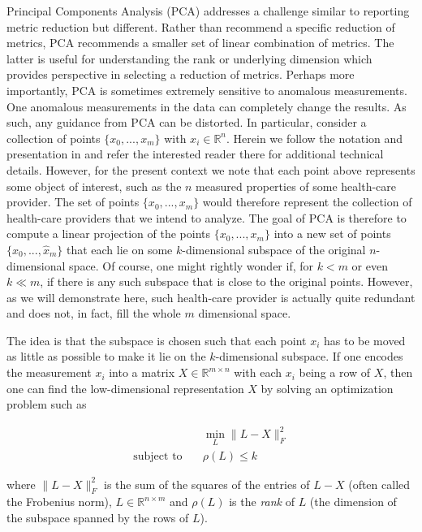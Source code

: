 \documentclass[conference]{IEEEtran}
\begin{document}
Principal Components Analysis (PCA) addresses a challenge similar to reporting metric reduction but different.  Rather than recommend a specific  reduction of metrics, PCA recommends a smaller set of linear combination of metrics.  The latter is useful for understanding the rank or underlying dimension which provides perspective in selecting a reduction of metrics. Perhaps more importantly,  PCA is sometimes extremely sensitive to anomalous measurements.  One anomalous measurements in the data can completely change the results.  As such, any guidance from PCA can be distorted.
In particular, consider a collection of
points $\{x_0,...,x_m\}$ with $x_i \in \mathbb{R}^n$.  Herein we follow the notation and presentation in \cite{paffenroth2018robust} and refer the interested reader there for additional technical details.  However, for the present context
we note that each point above represents some object  of interest, such as the $n$ measured properties of some health-care provider. The set of points $\{x_0,...,x_m\}$ would therefore
represent the collection of health-care providers that we intend to analyze.
The goal of PCA is therefore to compute a linear projection of the points $\{x_0,...,x_m\}$ into a new
set of points $\{\hat{x}_0,...,\hat{x}_m\}$ that each lie on some $k$-dimensional subspace of the original
$n$-dimensional space.  Of course, one might rightly wonder if, for $k < m$ or even $k \ll m$, if there is any 
such subspace that is close to the original points.  However, as we will demonstrate here, such health-care provider is
actually quite redundant and does not, in fact, fill the whole $m$ dimensional space.

The idea is that the subspace is chosen such that each point $x_i$ has to be moved as little as possible
to make it lie on the $k$-dimensional subspace.  If one encodes the measurement $x_i$ into a matrix
$X \in \mathbb{R}^{m \times n}$ with each $x_i$ being a row of $X$, then one can find
the low-dimensional representation $X$ by solving an optimization problem such as 

\begin{align} \label{PCAopt}
  &\min_{L} \| L-X \|_F^2 \\ \nonumber
  \text{subject to}\quad & \rho(L) \le k
\end{align}

\noindent where $\| L-X \|_F^2$ is the sum of the squares of the entries of $L-X$ (often called the Frobenius norm), $L \in \mathbb{R}^{n \times m}$ and $\rho(L)$ is the \emph{rank} of $L$ (the dimension of the subspace spanned by the rows of $L$).
\end{document}
